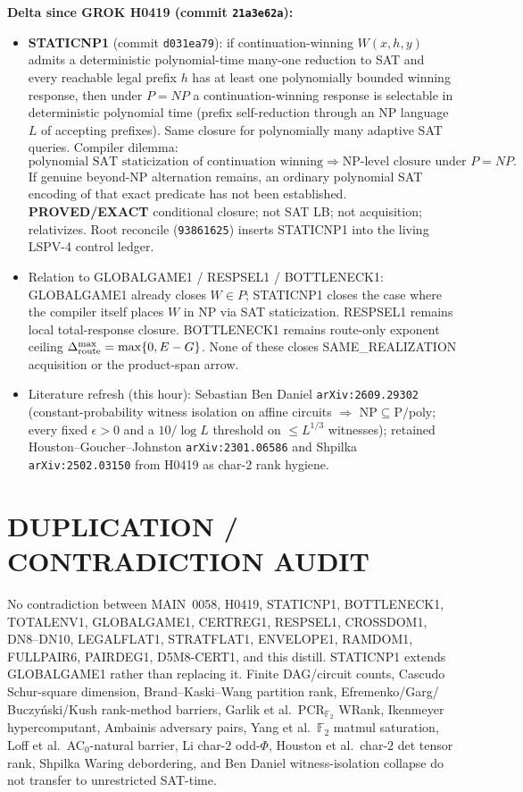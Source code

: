 \documentclass[11pt]{article}
\begin{document}
\textbf{Delta since GROK H0419 (commit \texttt{21a3e62a}):}
\begin{itemize}
\item \textbf{STATICNP1} (commit \texttt{d031ea79}): if continuation-winning
$W(x,h,y)$ admits a deterministic polynomial-time many-one reduction to SAT and
every reachable legal prefix $h$ has at least one polynomially bounded winning
response, then under $P=NP$ a continuation-winning response is selectable in
deterministic polynomial time (prefix self-reduction through an NP language $L$ of
accepting prefixes). Same closure for polynomially many adaptive SAT queries.
Compiler dilemma:
\[
\boxed{\text{polynomial SAT staticization of continuation winning}
\Longrightarrow\text{NP-level closure under }P=NP.}
\]
If genuine beyond-NP alternation remains, an ordinary polynomial SAT encoding of
that exact predicate has not been established. \textbf{PROVED/EXACT} conditional
closure; not SAT LB; not acquisition; relativizes. Root reconcile
(\texttt{93861625}) inserts STATICNP1 into the living LSPV-4 control ledger.
\item Relation to GLOBALGAME1 / RESPSEL1 / BOTTLENECK1: GLOBALGAME1 already
closes $W\in P$; STATICNP1 closes the case where the compiler itself places $W$
in NP via SAT staticization. RESPSEL1 remains local total-response closure.
BOTTLENECK1 remains route-only exponent ceiling $\Delta_{\rm route}^{\max}=\max\{0,E-G\}$.
None of these closes SAME\_REALIZATION acquisition or the product-span arrow.
\item Literature refresh (this hour): Sebastian Ben Daniel
\texttt{arXiv:2609.29302} (constant-probability witness isolation on affine
circuits $\Rightarrow$ $\mathrm{NP}\subseteq\mathrm{P/poly}$; every fixed
$\epsilon>0$ and a $10/\log L$ threshold on $\le L^{1/3}$ witnesses); retained
Houston--Goucher--Johnston \texttt{arXiv:2301.06586} and Shpilka
\texttt{arXiv:2502.03150} from H0419 as char-$2$ rank hygiene.
\end{itemize}

\section*{DUPLICATION / CONTRADICTION AUDIT}
No contradiction between MAIN~0058, H0419, STATICNP1, BOTTLENECK1, TOTALENV1,
GLOBALGAME1, CERTREG1, RESPSEL1, CROSSDOM1, DN8--DN10, LEGALFLAT1, STRATFLAT1,
ENVELOPE1, RAMDOM1, FULLPAIR6, PAIRDEG1, D5M8-CERT1, and this distill. STATICNP1
extends GLOBALGAME1 rather than replacing it. Finite DAG/circuit counts, Cascudo
Schur-square dimension, Brand--Kaski--Wang partition rank, Efremenko/Garg/
Buczy\'nski/Kush rank-method barriers, Garlik et al.\ PCR$_{\mathbb F_2}$ WRank,
Ikenmeyer hypercomputant, Ambainis adversary pairs, Yang et al.\ $\mathbb F_2$
matmul saturation, Loff et al.\ AC$_0$-natural barrier, Li char-$2$ odd-$\Phi$,
Houston et al.\ char-$2$ det tensor rank, Shpilka Waring debordering, and Ben Daniel
witness-isolation collapse do not transfer to unrestricted SAT-time.
\end{document}
